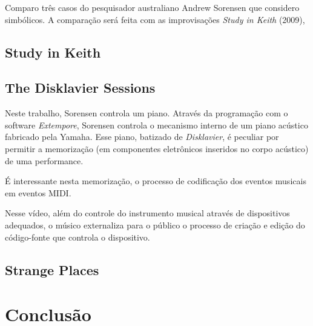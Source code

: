 \documentclass[
	12pt,				%
	openright,			%
	twoside,			%
	a4paper,			%
	english,			%
	french,				%
	spanish,			%
        italian,                        %
	brazil				%
	]{abntex2}
\begin{document}
Comparo três casos do pesquisador australiano Andrew Sorensen que considero simbólicos. A comparação será feita com as improvisações \emph{Study in Keith} (2009), 

\section{Study in Keith} 

\section{The Disklavier Sessions}

Neste trabalho, Sorensen controla um piano. Através da programação com o software \emph{Extempore}, Sorensen controla o mecanismo interno de um piano acústico fabricado pela Yamaha. Esse piano, batizado de \emph{Disklavier}, é peculiar por permitir a memorização (em componentes eletrônicos inseridos no corpo acústico) de uma performance.

É interessante nesta memorização, o processo de codificação dos eventos musicais em eventos MIDI.  

 Nesse vídeo, além do controle do instrumento musical
através de dispositivos adequados, o músico externaliza para o público o processo de
criação e edição do código-fonte que controla o dispositivo.

\section{Strange Places}

\chapter{Conclusão}


%
\postextual



%
%



\begin{apendicesenv}

%
%
%


\end{apendicesenv}


\printindex
\end{document}
